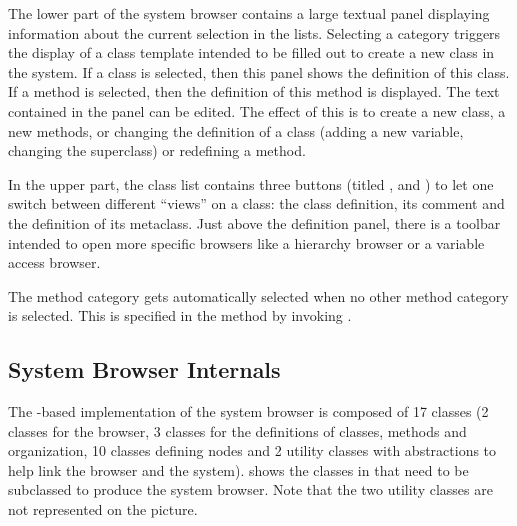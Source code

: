 \documentclass[a4paper,10pt,twoside]{book}
\begin{document}
The lower part of the system browser contains a large textual panel displaying information about the current selection in the lists. Selecting a category triggers the display of a class template intended to be filled out to create a new class in the system. If a class is selected, then this panel shows the definition of this class. If a method is selected, then the definition of this method is displayed. The text contained in the panel can be edited. The effect of this is to create a new class, a new methods, or changing the definition of a class (\eg adding a new variable, changing the superclass) or redefining a method.

In the upper part, the class list contains three buttons (titled ,  and ) to let one switch between different ``views'' on a class: the class definition, its comment and the definition of its metaclass. Just above the definition panel, there is a toolbar intended to open more specific browsers like a hierarchy browser or a variable access browser.

The  method category gets automatically selected when no other method category is selected. This is specified in the  method by invoking .

\subsection{System Browser Internals}
The \ob-based implementation of the \pharo system browser is composed of 17 classes (2 classes for the browser, 3 classes for the definitions of classes, methods and organization, 10 classes defining nodes and 2 utility classes with abstractions to help link the browser and the system).  shows the classes in \obf that need to be subclassed to produce the system browser. Note that the two utility classes are not represented on the picture.



\end{document}
